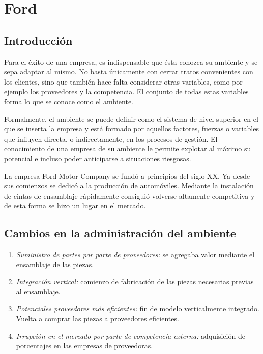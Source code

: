 \chapter{Ford}

\section{Introducci\'on}
	Para el \'exito de una empresa, es indispensable que \'esta conozca su ambiente y se sepa adaptar al mismo.
	No basta \'unicamente con cerrar tratos convenientes con los clientes, sino que tambi\'en hace falta considerar otras variables, como por ejemplo los proveedores y la competencia.
	El conjunto de todas estas variables forma lo que se conoce como el ambiente.

	Formalmente, el ambiente se puede definir como el sistema de nivel superior en el que se inserta la empresa y est\'a formado por aquellos factores, fuerzas o variables que influyen directa, o indirectamente, en los procesos de gesti\'on\cite{ITE}.
	El conocimiento de una empresa de su ambiente le permite explotar al m\'aximo su potencial e incluso poder anticiparse a situaciones riesgosas.

	La empresa Ford Motor Company  se fund\'o a principios del siglo XX.
	Ya desde sus comienzos se dedic\'o a la producci\'on de autom\'oviles.
	Mediante la instalaci\'on de cintas de ensamblaje r\'apidamente consigui\'o volverse altamente competitiva y de esta forma se hizo un lugar en el mercado.

\section{Cambios en la administraci\'on del ambiente}
	\begin{enumerate}
		\item{\emph{Suministro de partes por parte de proveedores:}} se agregaba valor mediante el ensamblaje de las piezas.
		\item{\emph{Integraci\'on vertical:}} comienzo de fabricaci\'on de las piezas necesarias previas al ensamblaje.
		\item{\emph{Potenciales proveedores m\'as eficientes:}} fin de modelo verticalmente integrado. Vuelta a comprar las piezas a proveedores eficientes.
		\item{\emph{Irrupci\'on en el mercado por parte de competencia externa:}} adquisici\'on de porcentajes en las empresas de proveedoras.
	\end{enumerate}


